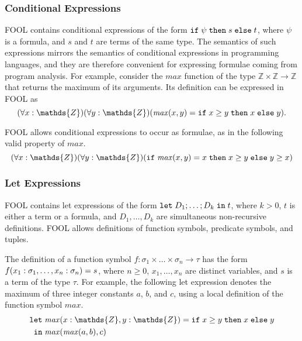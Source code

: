 \documentclass{easychair}
\begin{document}
\subsubsection{Conditional Expressions}
FOOL contains conditional expressions of the form $\mathtt{if}\;{\psi}\;\allowbreak\mathtt{then}\;{s}\;\allowbreak\mathtt{else}\;{t}$, where 
$\psi$ is a formula, and $s$ and $t$ are terms of the same type. 
The semantics of such expressions mirrors the semantics of conditional 
expressions in programming languages, and they are therefore convenient for 
expressing formulae coming from program analysis. 
For example, consider the $\mathit{max}$ function of the type 
$\mathds{Z}\times\mathds{Z}\to\mathds{Z}$ that returns the maximum of its 
arguments. 
Its definition can be expressed in FOOL as
\begin{equation}\label{eq:ite-t-example}
(\forall x:\mathds{Z})(\forall y:\mathds{Z})
(\mathit{max}(x, y) = \ite{x \geq y}{x}{y}).
\end{equation}

FOOL allows conditional expressions to occur as formulae, as in the
following valid property of $\mathit{max}$.
\begin{equation}\label{eq:ite-f-example}
(\forall x:\mathds{Z})(\forall y:\mathds{Z})
(\ite{\mathit{max}(x, y) = x}{x \geq y}{y \geq x})
\end{equation}

\subsubsection{Let Expressions}
FOOL contains let expressions of the form $\mathtt{let}\;{D_1;\ldots;D_k}\;\allowbreak\mathtt{in}\;{t}$, where
$k > 0$, $t$ is either a term or a formula, and $D_1,\ldots,D_k$ are
simultaneous non-recursive definitions. FOOL allows definitions of function
symbols, predicate symbols, and tuples.

The definition of a function symbol 
$f:\sigma_1\times\ldots\times\sigma_n\to\tau$ has the form 
${f(x_1:\sigma_1,\ldots,x_n:\sigma_n)}={s}$, where
$n \geq 0$, $x_1,\ldots,x_n$ are distinct variables, and $s$ is a term of the type $\tau$.
For example, the following let expression denotes the maximum of three 
integer constants $a$, $b$, and $c$, using a local definition of the function 
symbol $\mathit{max}$.
\begin{equation}\label{eq:fool-let-imply}
\begin{aligned}
\mathtt{let}\;&\binding{\mathit{max}(x:\mathds{Z},y:\mathds{Z})}
                       {\ite{x \geq y}{x}{y}}\\
 \mathtt{in}\;&\mathit{max}(\mathit{max}(a,b),c)
\end{aligned}
\end{equation}
\end{document}
